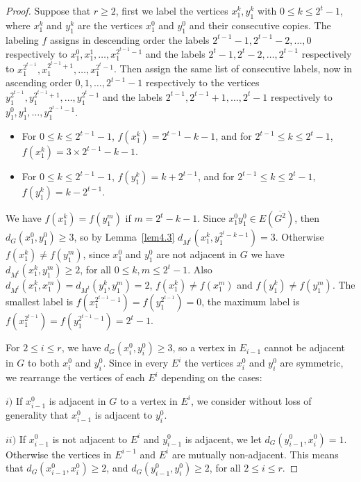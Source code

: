 \documentclass{article}
\newtheorem{open problem} {Open Problem}
\numberwithin{lemma}{section}
\numberwithin{theorem}{section}
\numberwithin{cor}{section}
\numberwithin{prop}{section}
\numberwithin{con}{section}
\numberwithin{claim}{section}
\numberwithin{obs}{section}
\numberwithin{dnt}{section}
\begin{document}
\begin{proof}
	Suppose that $r\geq 2$, first we label the vertices $x^k_1,y^k_1$  with $0\leq k\leq 2^t-1$, where $x^k_1$ and $y^k_1$  are the vertices $x^0_1$ and $y^0_1$ and their consecutive copies. The labeling $f$ assigns in descending order the labels $2^{t-1}-1,2^{t-1}-2,\ldots,0$ respectively to $x^0_1,x^1_1,\ldots,x^{2^{t-1}-1}_1$ and the labels $2^t-1,2^t-2,\ldots,2^{t-1}$ respectively to  $x^{2^{t-1}}_1,x^{2^{t-1}+1}_1,\ldots,x^{2^t-1}_1$. Then assign the same list of consecutive labels, now in ascending order $0,1,\ldots,2^{t-1}-1$ respectively to the vertices $y^{2^{t-1}}_1,y^{2^{t-1}+1}_1,\ldots,y^{2^t-1}_1$ and the labels $2^{t-1},2^{t-1}+1,\ldots,2^t-1$ respectively to $y^0_1,y^1_1,\ldots,y^{2^{t-1}-1}_1$.
	\begin{itemize}
		\item For $0\leq k \leq 2^{t-1}-1$, $f(x^k_1)=2^{t-1}-k-1$, and for $2^{t-1}\leq k \leq 2^t-1$,  $f(x^k_1)=3\times 2^{t-1}-k-1$.
		\item For $0\leq k \leq 2^{t-1}-1$, $f(y^k_1)=k+2^{t-1}$, and for $2^{t-1}\leq k \leq 2^t-1$,  $f(y^k_1)=k-2^{t-1}$.
	\end{itemize}
	\par  
	We have $f(x^k_1)=f(y^m_1)$ if $m=2^t-k-1$. Since $x^0_1y^0_1\in E(\overline{G^2})$, then  $d_G(x^0_1,y^0_1)\geq 3$, so by Lemma~\ref{lem4.3} $d_{M^t}(x^k_1,y^{2^t-k-1}_1)=3$. Otherwise $f(x^k_1)\neq f(y^m_1)$, since $x^0_1$ and $y^0_1$ are not adjacent in $G$ we have  $d_{M^t}(x^k_1,y^m_1)\geq 2$, for all $0\leq k,m \leq 2^t-1$. Also $d_{M^t}(x^k_1,x^m_1)=d_{M^t}(y^k_1,y^m_1)=2$, $f(x^k_1)\neq f(x^m_1)$ and $f(y^k_1)\neq f(y^m_1)$. The smallest label is $f(x^{2^{t-1}-1}_1)=f(y^{2^{t-1}}_1)=0$, the maximum label is $f(x^{2^{t-1}}_1)=f(y^{2^{t-1}-1}_1)=2^t-1$.\par
	For $2\leq i\leq r$,  we have $d_G(x^0_i,y^0_i)\geq 3$, so a vertex in $E_{i-1}$ cannot be adjacent in $G$ to both $x^0_i$ and $y^0_i$. Since in every $E^i$ the vertices $x^0_i$ and $y^0_i$ are symmetric, we rearrange the vertices of each $E^i$ depending on the cases:
	\item  $i)$ If $x^0_{i-1}$ is adjacent in $G$ to a vertex in $E^i$, we consider without loss of generality that $x^0_{i-1}$ is adjacent to $y^0_i$.
	\item  $ii)$ If $x^0_{i-1}$ is not adjacent to $E^i$ and $y^0_{i-1}$ is adjacent, we let $d_G(y^0_{i-1},x^0_i)=1$. Otherwise the vertices in $E^{i-1}$ and $E^i$ are mutually non-adjacent. This means that $d_G(x^0_{i-1},x^0_i)\geq 2$, and $d_G(y^0_{i-1},y^0_i)\geq 2$, for all $2\leq i\leq r$.\par

\end{proof}
\end{document}
